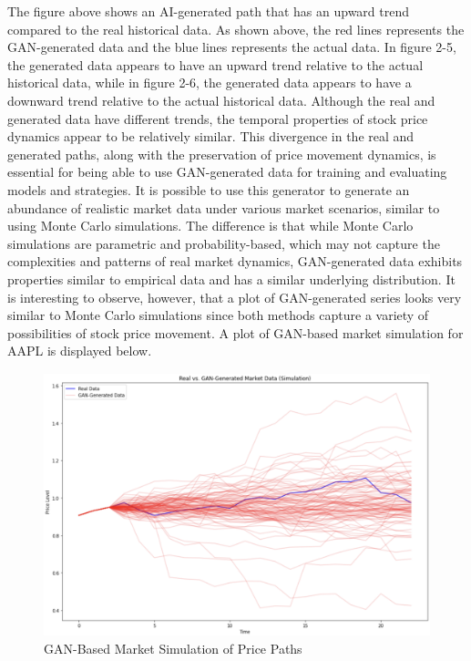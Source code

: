 \noindent The figure above shows an AI-generated path that has an upward trend compared to the real historical data. As shown above, the red lines represents the GAN-generated data and the blue lines represents the actual data. In figure 2-5, the generated data appears to have an upward trend relative to the actual historical data, while in figure 2-6, the generated data appears to have a downward trend relative to the actual historical data. Although the real and generated data have different trends, the temporal properties of stock price dynamics appear to be relatively similar. This divergence in the real and generated paths, along with the preservation of price movement dynamics, is essential for being able to use GAN-generated data for training and evaluating models and strategies. It is possible to use this generator to generate an abundance of realistic market data under various market scenarios, similar to using Monte Carlo simulations. The difference is that while Monte Carlo simulations are parametric and probability-based, which may not capture the complexities and patterns of real market dynamics, GAN-generated data exhibits properties similar to empirical data and has a similar underlying distribution. It is interesting to observe, however, that a plot of GAN-generated series looks very similar to Monte Carlo simulations since both methods capture a variety of possibilities of stock price movement. A plot of GAN-based market simulation for AAPL is displayed below.
\begin{figure}[h]
\centering
\includegraphics[width=14cm]{templates/assets/gan/gan_simulation.png}
\caption{GAN-Based Market Simulation of Price Paths}
\end{figure}

